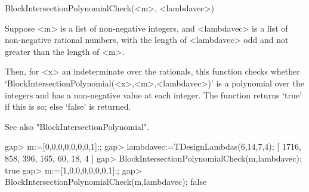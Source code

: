 \>BlockIntersectionPolynomialCheck(<m>, <lambdavec>)

Suppose <m> is a list of non-negative integers, and <lambdavec> is a
list of non-negative rational numbers, with the length of <lambdavec>
odd and not greater than the length of <m>.

Then, for <x> an indeterminate over the rationals, this function
checks whether `BlockIntersectionPolynomial(<x>,<m>,<lambdavec>)' is a
polynomial over the integers and has a non-negative value at each integer.
The function returns `true' if this is so; else `false' is returned.

See also "BlockIntersectionPolynomial".

\beginexample
gap> m:=[0,0,0,0,0,0,0,1];;
gap> lambdavec:=TDesignLambdas(6,14,7,4);
[ 1716, 858, 396, 165, 60, 18, 4 ]
gap> BlockIntersectionPolynomialCheck(m,lambdavec);
true
gap> m:=[1,0,0,0,0,0,0,1];;
gap> BlockIntersectionPolynomialCheck(m,lambdavec);
false
\endexample

